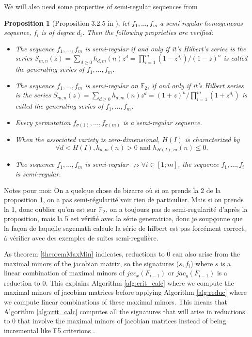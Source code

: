 \documentclass[english]{article}
\newtheorem{proposition}{Proposition}[section]
\begin{document}
		We will also need some properties of semi-regular sequences from \cite{Bardet04}
		
		\begin{proposition}[Proposition 3.2.5 in \cite{Bardet04}]\label{PropSemi}
			let $f_1,\dots,f_m$ a semi-regular homogeneous sequence, $f_i$ is of degree $d_i$. Then the following proprieties are verified:
			\begin{itemize}
				\item The sequence $f_1,\dots,f_m$ is semi-regular if and only if it's Hilbert's series is the series $S_{m, n}(z) = \sum_{d \geq 0}h_{d, m}(n)z^d = \prod_{i=1}^{m}(1-z^{d_i})/(1-z)^n$ is called the generating series of $f_1,\dots,f_m$.
				\item The sequence $f_1,\dots,f_m$ is semi-regular on $\mathbb{F}_2$, if and only if it's Hilbert series is the series $S_{m, n}(z) = \sum_{d \geq 0}h_{d, m}(n)z^d = (1+z)^n/\prod_{i=1}^{m}(1+z^{d_i})$ is called the generating series of $f_1,\dots,f_m$.
				\item Every permutation $f_{\sigma(1)},\dots,f_{\sigma(m)}$ is a semi-regular sequence.
				\item When the associated variety is zero-dimensional, $H(I)$ is characterized by
				$$
					\forall d < H(I), h_{d, m}(n) > 0 \text{ and } h_{H(I), m}(n) \leq 0.
				$$
				\item The sequence $f_1,\dots,f_m$ is semi-regular $\nRightarrow \forall i \in [1;m]$, the sequence $f_1,\dots,f_i$ is semi-regular. 
			\end{itemize}
		\end{proposition}
		
		Notes pour moi: On a quelque chose de bizarre où si on prends la 2 de la proposition \ref{PropSemi}, on a pas semi-régularité voir rien de particulier. Mais si on prends la 1, donc oublier qu'on est sur $\mathbb{F_2}$, on a toujours pas de semi-regularité d'après la proposition, mais la 5 est vérifié avec la série generatrice, donc je soupçonne que la façon de laquelle sagemath calcule la série de hilbert est pas forcément correct, à vérifier avec des exemples de suites semi-regulière.
		
		As theorem \ref{theoremMaxMin} indicates, reductions to 0 can also arise from the maximal minors of the jacobian matrix, so the signatures ($s, f_i$) where $s$ is a linear combination of maximal minors of $jac_{x}(F_{i-1})$ or $jac_{y}(F_{i-1})$ is a reduction to 0.
		This explains Algorithm \ref{alg:crit_calc} where we compute the maximal minors of jacobian matrices before applying Algorithm \ref{alg:reduc} where we compute linear combinations of these maximal minors.
		This means that Algorithm \ref{alg:crit_calc} computes all the signatures that will arise in reductions to 0 that involve the maximal minors of jacobian matrices instead of being incremental like F5 criterions \cite{F02}.
					
\end{document}
